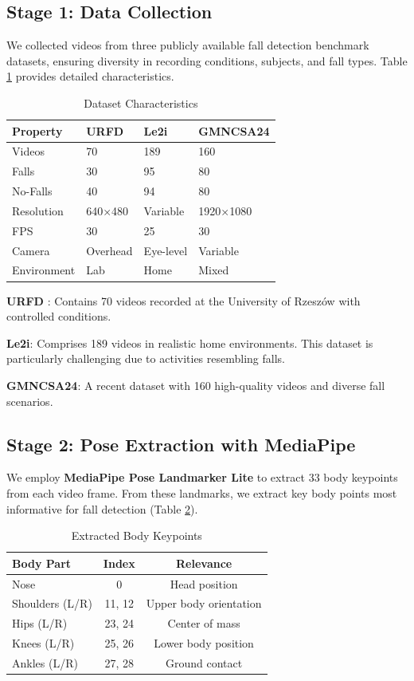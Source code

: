 \documentclass[conference]{IEEEtran}
\begin{document}
\subsection{Stage 1: Data Collection}

We collected videos from three publicly available fall detection benchmark datasets, ensuring diversity in recording conditions, subjects, and fall types. Table \ref{tab:dataset_details} provides detailed characteristics.

\begin{table}[!t]
\centering
\caption{Dataset Characteristics}
\label{tab:dataset_details}
\begin{tabular}{p{1.5cm}p{1.8cm}p{1.8cm}p{1.8cm}}
\toprule
\textbf{Property} & \textbf{URFD} & \textbf{Le2i} & \textbf{GMNCSA24} \\
\midrule
Videos & 70 & 189 & 160 \\
Falls & 30 & 95 & 80 \\
No-Falls & 40 & 94 & 80 \\
Resolution & 640×480 & Variable & 1920×1080 \\
FPS & 30 & 25 & 30 \\
Camera & Overhead & Eye-level & Variable \\
Environment & Lab & Home & Mixed \\
\bottomrule
\end{tabular}
\end{table}

\textbf{URFD} \cite{kwolek2014human}: Contains 70 videos recorded at the University of Rzeszów with controlled conditions.

\textbf{Le2i}: Comprises 189 videos in realistic home environments. This dataset is particularly challenging due to activities resembling falls.

\textbf{GMNCSA24}: A recent dataset with 160 high-quality videos and diverse fall scenarios.

\subsection{Stage 2: Pose Extraction with MediaPipe}

We employ \textbf{MediaPipe Pose Landmarker Lite} to extract 33 body keypoints from each video frame. From these landmarks, we extract key body points most informative for fall detection (Table \ref{tab:keypoints}).

\begin{table}[!t]
\centering
\caption{Extracted Body Keypoints}
\label{tab:keypoints}
\begin{tabular}{lcc}
\toprule
\textbf{Body Part} & \textbf{Index} & \textbf{Relevance} \\
\midrule
Nose & 0 & Head position \\
Shoulders (L/R) & 11, 12 & Upper body orientation \\
Hips (L/R) & 23, 24 & Center of mass \\
Knees (L/R) & 25, 26 & Lower body position \\
Ankles (L/R) & 27, 28 & Ground contact \\
\bottomrule
\end{tabular}
\end{table}
\end{document}
